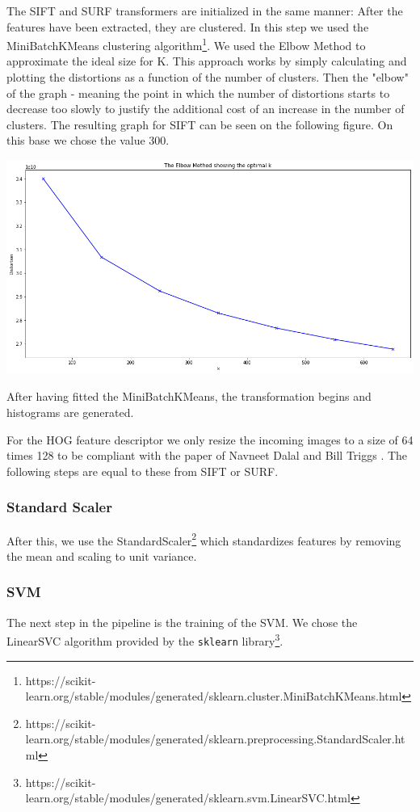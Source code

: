 \documentclass{scrartcl}
\begin{document}
The SIFT and SURF transformers are initialized in the same manner: After the features have been extracted, they are clustered.
In this step we used the MiniBatchKMeans clustering algorithm\footnote{https://scikit-learn.org/stable/modules/generated/sklearn.cluster.MiniBatchKMeans.html}. We used the Elbow Method to approximate the ideal size for K.
This approach works by simply calculating and plotting the distortions as a function of the number of clusters. Then the "elbow" of the graph - meaning the point in which the number of distortions starts to decrease too slowly to justify the additional cost of an increase in the number of clusters. The resulting graph for SIFT can be seen on the following figure. On this base we chose the value 300.
\begin{center}
  \includegraphics[scale=0.3]{img/kmeans-sift}
\end{center}
After having fitted the MiniBatchKMeans, the transformation begins and histograms are generated.

For the HOG feature descriptor we only resize the incoming images to a size of 64 times 128 to be compliant with the paper of Navneet Dalal and Bill Triggs \cite{Hog_article}. The following steps are equal to these from SIFT or SURF.

\subsubsection{Standard Scaler}
After this, we use the StandardScaler\footnote{https://scikit-learn.org/stable/modules/generated/sklearn.preprocessing.StandardScaler.html} which standardizes features by removing the mean and scaling to unit variance.

\subsubsection{SVM}
The next step in the pipeline is the training of the SVM.
We chose the LinearSVC algorithm provided by the \texttt{sklearn} library\footnote{https://scikit-learn.org/stable/modules/generated/sklearn.svm.LinearSVC.html}.
\end{document}
